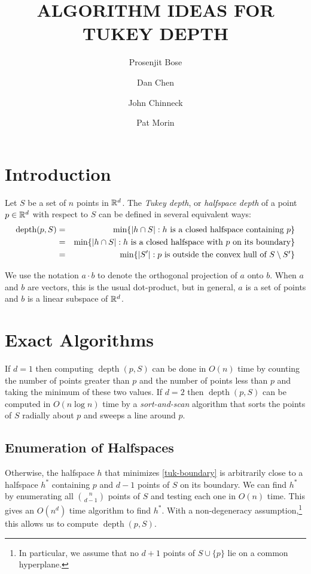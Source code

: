 \documentclass[lotsofwhite,12pt]{patmorin}
\title{\MakeUppercase{Algorithm Ideas for Tukey Depth}}
\author{Prosenjit Bose \and Dan Chen \and John Chinneck \and Pat Morin}
\DeclareMathOperator{\td}{depth}
\begin{document}
\maketitle

\section{Introduction}

Let $S$ be a set of $n$ points in $\mathbb{R}^d$.
The \emph{Tukey depth}, or \emph{halfspace depth} of a point $p\in\mathbb{R}^d$ with
respect to $S$ can be defined in several equivalent ways:
\begin{eqnarray}
\td(p,S) & = & \min\{ |h\cap S| :
                     \mbox{$h$ is a closed halfspace containing $p$} \} 
                       \eqlabel{tuk-orig} \\ 
            & = & \min\{ |h\cap S| :
                      \mbox{$h$ is a closed halfspace 
                            with $p$ on its boundary} \} 
                        \eqlabel{tuk-boundary} \\ 
            & = & \min\{ |S'| :
                      \mbox{$p$ is outside the convex hull of 
                           $S\setminus S'$} \}
                      \eqlabel{tuk-hull}
\end{eqnarray}

We use the notation $a\cdot b$ to denote the orthogonal projection of
$a$ onto $b$. When $a$ and $b$ are vectors, this is the usual
dot-product, but in general, $a$ is a set of points and $b$ is a
linear subspace of $\mathbb{R}^d$.


\section{Exact Algorithms}

If $d=1$ then computing $\td(p,S)$ can be done in $O(n)$ time by
counting the number of points greater than $p$ and the number of
points less than $p$ and taking the minimum of these two values.  If
$d=2$ then $\td(p,S)$ can be computed in $O(n\log n)$ time by
a \emph{sort-and-scan} algorithm that sorts the points of $S$ radially
about $p$ and sweeps a line around $p$.

\subsection{Enumeration of Halfspaces}

Otherwise, the halfspace $h$ that minimizes \eqref{tuk-boundary} is
arbitrarily close to a halfspace $h^*$ containing $p$ and $d-1$ points
of $S$ on its boundary.  We can find $h^*$ by enumerating all $n
\choose d-1$ points of $S$ and testing each one in $O(n)$ time. This
gives an $O(n^d)$ time algorithm to find $h^*$.  With a non-degeneracy
assumption,\footnote{In particular, we assume that no $d+1$ points of
$S\cup\{p\}$ lie on a common hyperplane.} this allows us to compute
$\td(p,S)$.
\end{document}

